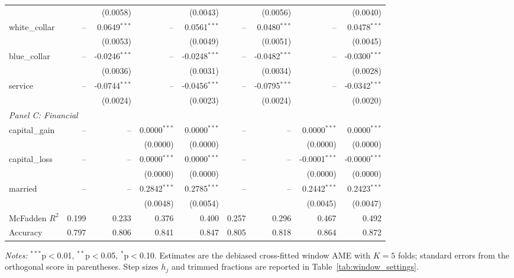 \documentclass[12pt,a4paper]{article}
\numberwithin{equation}{section}
\theoremstyle{plain}
\theoremstyle{definition}
\begin{document}
\begin{table}[htbp]
{\begin{threeparttable}
\begin{tabular}{lrrrrrrrr}
				&  & (0.0058) &  & (0.0043) &  & (0.0056) &  & (0.0040) \\
				\quad white\_collar & -- & 0.0649$^{***}$ & -- & 0.0561$^{***}$ & -- & 0.0480$^{***}$ & -- & 0.0478$^{***}$ \\
				&  & (0.0053) &  & (0.0049) &  & (0.0051) &  & (0.0045) \\
				\quad blue\_collar & -- & -0.0246$^{***}$ & -- & -0.0248$^{***}$ & -- & -0.0482$^{***}$ & -- & -0.0300$^{***}$ \\
				&  & (0.0036) &  & (0.0031) &  & (0.0034) &  & (0.0028) \\
				\quad service & -- & -0.0744$^{***}$ & -- & -0.0456$^{***}$ & -- & -0.0795$^{***}$ & -- & -0.0342$^{***}$ \\
				&  & (0.0024) &  & (0.0023) &  & (0.0024) &  & (0.0020) \\
				\midrule
				\multicolumn{9}{l}{\textit{Panel C: Financial}} \\
				\quad capital\_gain & -- & -- & 0.0000$^{***}$ & 0.0000$^{***}$ & -- & -- & 0.0000$^{***}$ & 0.0000$^{***}$ \\
				&  &  & (0.0000) & (0.0000) &  &  & (0.0000) & (0.0000) \\
				\quad capital\_loss & -- & -- & 0.0000$^{***}$ & 0.0000$^{***}$ & -- & -- & -0.0001$^{***}$ & -0.0000$^{***}$ \\
				&  &  & (0.0000) & (0.0000) &  &  & (0.0000) & (0.0000) \\
				\quad married & -- & -- & 0.2842$^{***}$ & 0.2785$^{***}$ & -- & -- & 0.2442$^{***}$ & 0.2423$^{***}$ \\
				&  &  & (0.0048) & (0.0054) &  &  & (0.0045) & (0.0047) \\
				\midrule
				McFadden $R^2$ & 0.199 & 0.233 & 0.376 & 0.400 & 0.257 & 0.296 & 0.467 & 0.492 \\
				Accuracy & 0.797 & 0.806 & 0.841 & 0.847 & 0.805 & 0.818 & 0.864 & 0.872 \\
				\bottomrule
				\end{tabular}
				\begin{tablenotes}
				\footnotesize
				\item \textit{Notes:} $^{***}$p$<$0.01, $^{**}$p$<$0.05, $^{*}$p$<$0.10. Estimates are the debiased cross-fitted window AME with $K=5$ folds; standard errors from the orthogonal score in parentheses. Step sizes $h_j$ and trimmed fractions are reported in Table~\ref{tab:window_settings}.
				\end{tablenotes}
		\end{threeparttable}
		}%
	\end{table}
	
\end{document}
